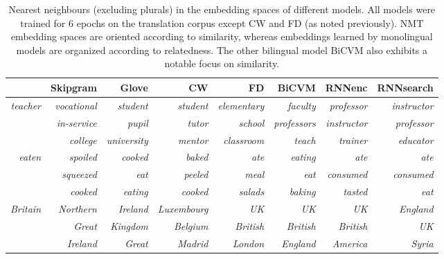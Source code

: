 \begin{table}[t]

\begin{center}
\renewcommand{\tabcolsep}{4.6pt}
\begin{adjustwidth}{-1cm}{}
\begin{tabular}{r | r  r  r | r r | r r}
&\bf Skipgram &\bf Glove &\bf CW&\bf FD &\bf BiCVM  &\bf RNNenc &\bf RNNsearch \\ 
\hline
\emph{teacher}  & {\small \emph{vocational}} &  {\small \emph{student}} 
& {\small \emph{student}} &{\small \emph{elementary}} & {\small  \emph{faculty}} & {\small \emph{professor}}  & {\small \emph{instructor}} \\ 
 & {\small \emph{in-service}} &  {\small \emph{pupil}} 
& {\small \emph{tutor}} & {\small \emph{school}}& {\small  \emph{professors}} & {\small \emph{instructor}}  & {\small \emph{professor}} \\ 
 & {\small \emph{college}} &  {\small \emph{university}} 
& {\small \emph{mentor}} & {\small \emph{classroom}}& {\small \emph{teach}}& {\small \emph{trainer}}  & {\small \emph{educator}} \\ 
\hdashline
\emph{eaten}  & {\small \emph{spoiled}} &  {\small \emph{cooked}} 
&  {\small \emph{baked}} &{\small \emph{ate}}& {\small  \emph{eating}}& {\small \emph{ate}} & {\small \emph{ate}} \\ 
  & {\small \emph{squeezed}} &  {\small \emph{eat}} 
&  {\small \emph{peeled}} &{\small \emph{meal}}& {\small \emph{eat}}& {\small \emph{consumed}} & {\small \emph{consumed}} \\ 
  & {\small \emph{cooked}} &  {\small \emph{eating}} 
&  {\small \emph{cooked}} &{\small \emph{salads}}& {\small \emph{baking}}& {\small \emph{tasted}} & {\small \emph{eat}} \\ 
\hdashline
\emph{Britain}  & {\small \emph{Northern}} &  {\small \emph{Ireland}} 
& {\small \emph{Luxembourg}} &{\small \emph{UK}}& {\small \emph{UK}} & {\small  \emph{UK}} & {\small \emph{England}} \\ 
& {\small \emph{Great}} &  {\small \emph{Kingdom}} 
& {\small \emph{Belgium}} &{\small \emph{British}}& {\small \emph{British}} & {\small  \emph{British}} & {\small \emph{UK}} \\ 
 & {\small \emph{Ireland}} &  {\small \emph{Great}} 
& {\small \emph{Madrid}} &{\small \emph{London}}& {\small \emph{England}} & {\small  \emph{America}} & {\small \emph{Syria}} \\ 


\end{tabular}
\end{adjustwidth}
\caption{Nearest neighbours (excluding plurals) in the embedding spaces of different models. All models were trained for 6 epochs on the translation corpus except CW and FD (as noted previously). NMT embedding spaces are oriented according to similarity, whereas embeddings learned by monolingual models are organized according to relatedness. The other bilingual model BiCVM also exhibits a notable focus on similarity.}
\label{table:neigh}
\end{center}
\vspace{-5mm}

\end{table}

